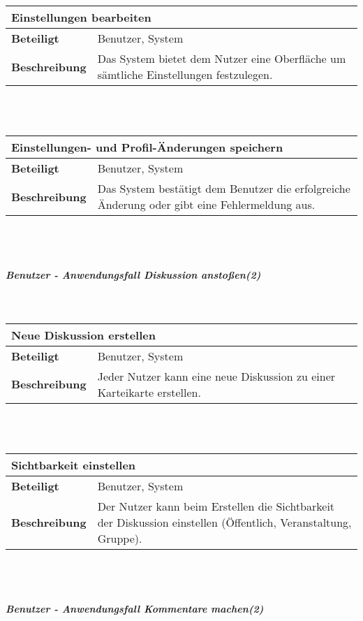 \documentclass[12pt,a4paper]{article}
\begin{document}
\begin{tabular}{l p{10cm}}
\multicolumn{2}{l}{\textbf{Einstellungen bearbeiten}} \\ \hline
\textbf{Beteiligt} & Benutzer, System \\ \hline 
\textbf{Beschreibung} & Das System bietet dem Nutzer eine Oberfläche um sämtliche Einstellungen festzulegen.\\ 
\hline 
\end{tabular}\\\\

\begin{tabular}{l p{10cm}}
\multicolumn{2}{l}{\textbf{Einstellungen- und Profil-Änderungen speichern}} \\ \hline
\textbf{Beteiligt} & Benutzer, System \\ \hline 
\textbf{Beschreibung} & Das System bestätigt dem Benutzer die erfolgreiche Änderung oder gibt eine Fehlermeldung aus.\\ 
\hline 
\end{tabular}\\\\
\subparagraph{Benutzer - Anwendungsfall \glqq Diskussion anstoßen\grqq (2)}\mbox{}\\

\begin{tabular}{l p{10cm}}
\multicolumn{2}{l}{\textbf{Neue Diskussion erstellen}} \\ \hline
\textbf{Beteiligt} & Benutzer, System \\ \hline 
\textbf{Beschreibung} & Jeder Nutzer kann eine neue Diskussion zu einer Karteikarte erstellen.\\ 
\hline 
\end{tabular}\\\\

\begin{tabular}{l p{10cm}}
\multicolumn{2}{l}{\textbf{Sichtbarkeit einstellen}} \\ \hline
\textbf{Beteiligt} & Benutzer, System \\ \hline 
\textbf{Beschreibung} & Der Nutzer kann beim Erstellen die Sichtbarkeit der Diskussion einstellen (Öffentlich, Veranstaltung, Gruppe).\\ 
\hline 
\end{tabular}\\\\
\subparagraph{Benutzer - Anwendungsfall \glqq Kommentare machen\grqq (2)}\mbox{}\\
\end{document}
